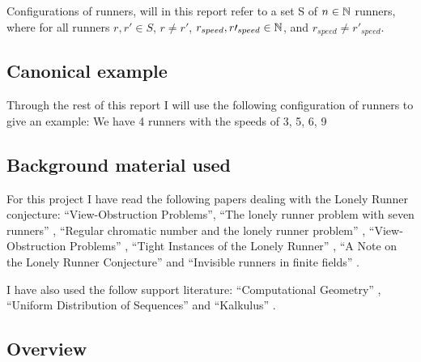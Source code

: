 \begin{defi}
\label{def:config}
Configurations of runners, will in this report refer to a set S of $n \in \mathbb{N}$ runners, where for all runners $r, r\prime \in S$, $r \neq r\prime$, $r_{speed}, r\prime_{speed} \in \mathbb{N}$, and $r_{speed} \neq r\prime_{speed}$.
\end{defi}

\subsection{Canonical example}
Through the rest of this report I will use the following configuration
of runners to give an example:
We have 4 runners with the speeds of 3, 5, 6, 9

\subsection{Background material used}
\label{background}
For this project I have read the following papers dealing with the Lonely Runner conjecture: ``View-Obstruction Problems''\cite{Bienia97flows.view-obstructions}, ``The lonely runner problem with seven runners'' \cite{serra_thelonely}, ``Regular chromatic number and the lonely runner problem'' \cite{Barajas2007479}, ``View-Obstruction Problems'' \cite{springerlink:10.1007/BF01832623}, ``Tight Instances of the Lonely Runner'' \cite{Goddyn96tightinstances}, ``A Note on the Lonely Runner Conjecture'' \cite{ANote} and ``Invisible runners in finite fields'' \cite{invis}.

I have also used the follow support literature:
``Computational Geometry'' \cite{citeulike:3347056}, ``Uniform Distribution of Sequences'' \cite{uniform} and ``Kalkulus'' \cite{kalkulus}.

\subsection{Overview}

